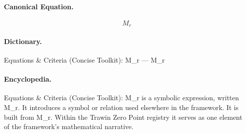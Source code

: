 \paragraph{Canonical Equation.}
\[
M_r
\]

\paragraph{Dictionary.}
Equations \& Criteria (Concise Toolkit): M\_r — M\_r

\paragraph{Encyclopedia.}
Equations \& Criteria (Concise Toolkit): M\_r is a symbolic expression, written M\_r. It introduces a symbol or relation used elsewhere in the framework. It is built from M\_r. Within the Trawin Zero Point registry it serves as one element of the framework's mathematical narrative.
